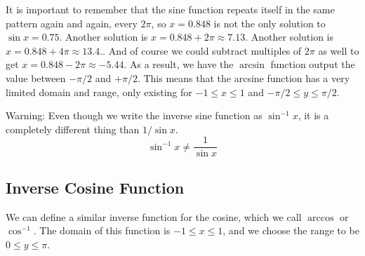It is important to remember that the sine function repeats itself in the same pattern
again and again, every $2\pi$, so $x = 0.848$ is not the only solution to $\sin x = 0.75$.
Another solution is $x = 0.848 + 2 \pi \approx 7.13$.  Another solution is $x = 0.848 + 4
\pi \approx 13.4.$.  And of course we could subtract multiples of $2 \pi$ as well to get
$x = 0.848 - 2 \pi \approx -5.44$.  As a result, we have the $\arcsin$ function output the
value between $-\pi/2$ and $+\pi/2$.  This means that the arcsine function has a very
limited domain and range, only existing for $ -1 \leq x \leq 1$ and $-\pi/2 \leq y \leq
\pi/2$.
\begin{center}
\end{center}

Warning:  Even though we write the inverse sine function as $\sin^{-1} x$, it is a completely different thing than $1 / \sin x$.
\[ \sin^{-1}x \neq \frac{1}{\sin x} \]

\subsection*{Inverse Cosine Function}

We can define a similar inverse function for the cosine, which we call $\arccos$ or
$\cos^{-1}$.  The domain of this function is $-1 \leq x \leq 1$, and we choose the range
to be $0 \leq y \leq \pi$.
\begin{center}
\end{center}

